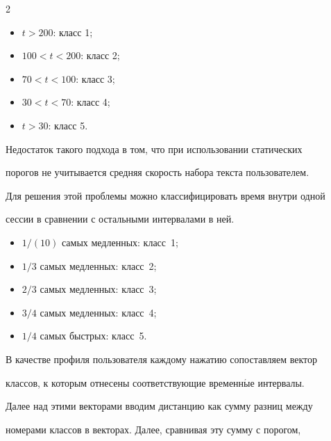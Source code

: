 \begin{multicols}{2}
\begin{itemize}

    \item $t > 200$: класс 1;\\[-14pt]

    \item $100 <t < 200$: класс 2;\\[-14pt]

    \item $70<t < 100$: класс 3;\\[-14pt]

    \item $30< t < 70$: класс 4;\\[-14pt]

    \item $t>30$: класс 5.

\end{itemize}

Недостаток такого подхода в том, что при использовании статических

порогов не учитывается средняя скорость набора текста пользователем.

Для решения этой проблемы можно классифицировать время внутри одной

сессии в сравнении с остальными интервалами в ней.

\begin{itemize}

    \item ${1}/(10)$ самых медленных: класс~1;

    \item ${1}/{3}$ самых медленных: класс~2;

    \item ${2/}{3}$ самых медленных: класс~3;

    \item ${3}/{4}$ самых медленных: класс~4;

    \item ${1}/{4}$ самых быстрых: класс~5.

\end{itemize}

В качестве профиля пользователя каждому нажатию сопоставляем вектор

классов, к которым отнесены соответствующие временн$\acute{\mbox{ы}}$е интервалы.

Далее над этими векторами вводим дистанцию как сумму разниц между

номерами классов в векторах. Далее, сравнивая эту сумму с порогом,


\end{multicols}
